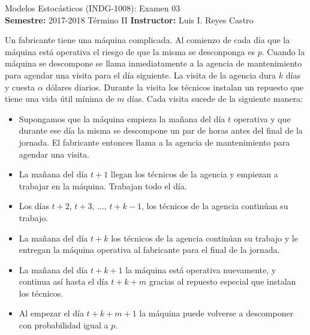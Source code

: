 \documentclass[ a4paper, twoside, 11pt]{article}
\newcommand{\numero}{03}
\begin{document}
\allowdisplaybreaks



\begin{center}
\Large Modelos Estoc\'asticos (INDG-1008): Examen \numero \\[2ex]
\small \textbf{Semestre:} 2017-2018 T\'ermino II \qquad
\textbf{Instructor:} Luis I. Reyes Castro
\end{center}
\fullskip

\begin{problem}
\label{prob:maquina-caprichosa}
Un fabricante tiene una m\'aquina complicada. Al comienzo de cada d\'ia que la m\'aquina est\'a operativa el riesgo de que la misma se desconponga es $p$. Cuando la m\'aquina se descompone se llama inmediatamente a la agencia de mantenimiento para agendar una visita para el d\'ia siguiente. La visita de la agencia dura $k$ d\'ias y cuesta $\alpha$ d\'olares diarios. Durante la visita los t\'ecnicos instalan un repuesto que tiene una vida \'util m\'inima de $m$ d\'ias. Cada visita sucede de la siguiente manera: 
\begin{itemize}
\item Supongamos que la m\'aquina empieza la ma\~nana del d\'ia $t$ operativa y que durante ese d\'ia la misma se descompone un par de horas antes del final de la jornada. El fabricante entonces llama a la agencia de mantenimiento para agendar una visita. 
\item La ma\~nana del d\'ia $t+1$ llegan los t\'ecnicos de la agencia y empiezan a trabajar en la m\'aquina. Trabajan todo el d\'ia. 
\item Los d\'ias $t+2$, $t+3$, $\dots$, $t+k-1$, los t\'ecnicos de la agencia contin\'uan su trabajo. 
\item La ma\~nana del d\'ia $t+k$ los t\'ecnicos de la agencia contin\'uan su trabajo y le entregan la m\'aquina operativa al fabricante para el final de la jornada. 
\item La ma\~nana del d\'ia $t+k+1$ la m\'aquina est\'a operativa nuevamente, y continua as\'i hasta el d\'ia $t+k+m$ gracias al repuesto especial que instalan los t\'ecnicos. 
\item Al empezar el d\'ia $t+k+m+1$ la m\'aquina puede volverse a descomponer con probabilidad igual a $p$. 
\end{itemize}


\end{problem}
\end{document}
